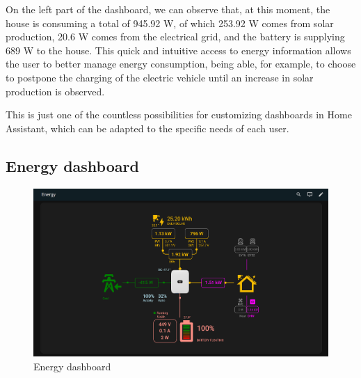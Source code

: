\documentclass[graybox]{svmult}
\begin{document}
On the left part of the dashboard, we can observe that, at this moment, the house is consuming a total of 945.92 W, of which 253.92 W comes from solar production, 20.6 W comes from the electrical grid, and the battery is supplying 689 W to the house. This quick and intuitive access to energy information allows the user to better manage energy consumption, being able, for example, to choose to postpone the charging of the electric vehicle until an increase in solar production is observed.

This is just one of the countless possibilities for customizing dashboards in Home Assistant, which can be adapted to the specific needs of each user.


\subsection{Energy dashboard}

\begin{figure}[H] 
	\centering
	\includegraphics[width=\textwidth]{energy.png}
	\caption{Energy dashboard}
	\label{fig:energy.png}
\end{figure}
\end{document}
